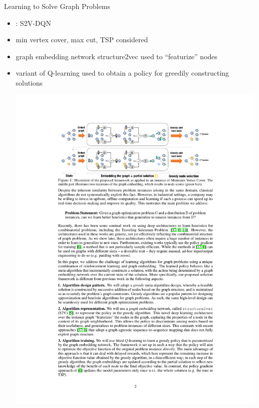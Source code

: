 \documentclass[aspectratio=1610]{beamer}
\newcommand{\important}[1]{{\color{green!60!black}#1}}
\begin{document}
\begin{frame}{Learning to Solve Graph Problems}
	\begin{itemize}
		\itemsep2ex
		\item {}: \important{S2V-DQN}
		\item min vertex cover, max cut, TSP considered 
		\item graph embedding network \important{structure2vec} used to ``featurize'' nodes
		\item variant of Q-learning used to obtain a policy for greedily constructing solutions
		\begin{center}
			\includegraphics[width=1\linewidth]{figures/dai}
		\end{center}
	\end{itemize}
\end{frame}
\end{document}
